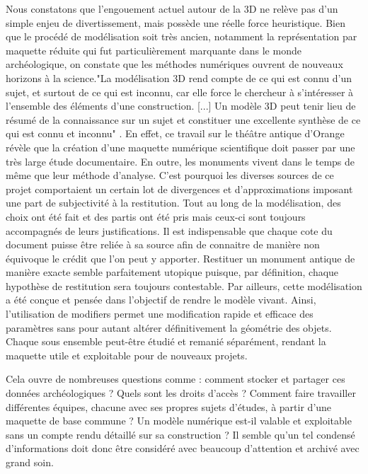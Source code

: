 Nous constatons que l'engouement actuel autour de la 3D ne relève pas d'un simple enjeu de divertissement, mais possède une réelle force heuristique. Bien que le procédé de modélisation soit très ancien, notamment la représentation par maquette réduite qui fut particulièrement marquante dans le monde archéologique, on constate que les méthodes numériques ouvrent de nouveaux horizons à la science."La modélisation 3D rend compte de ce qui est connu d’un sujet, et surtout de ce qui est inconnu, car elle force le chercheur à s’intéresser à l’ensemble des éléments d’une construction. [...] Un modèle 3D peut tenir lieu de résumé de la connaissance sur un sujet et constituer une excellente synthèse de ce qui est connu et inconnu" \cite[p. 249]{rocheleau}. En effet, ce travail sur le théâtre antique d'Orange révèle que la création d'une maquette numérique scientifique doit passer par une très large étude documentaire. En outre, les monuments vivent dans le temps de même que leur méthode d'analyse. C'est pourquoi les diverses sources de ce projet comportaient un certain lot de divergences et d'approximations imposant une part de subjectivité à la restitution. Tout au long de la modélisation, des choix ont été fait et des partis ont été pris mais ceux-ci sont toujours accompagnés de leurs justifications. Il est indispensable que chaque cote du document puisse être reliée à sa source afin de connaitre de manière non équivoque le crédit que l'on peut y apporter. Restituer un monument antique de manière exacte semble parfaitement utopique puisque, par définition, chaque hypothèse de restitution sera toujours contestable.
Par ailleurs, cette modélisation a été conçue et pensée dans l'objectif de rendre le modèle vivant. Ainsi, l'utilisation de \glspl{modifier} permet une modification rapide et efficace des paramètres sans pour autant altérer définitivement la géométrie des objets. Chaque sous ensemble peut-être étudié et remanié séparément, rendant la maquette utile et exploitable pour de nouveaux projets.

Cela ouvre de nombreuses questions comme : comment stocker et partager ces données archéologiques ? Quels sont les droits d'accès ? Comment faire travailler différentes équipes, chacune avec ses propres sujets d'études, à partir d'une maquette de base commune ? Un modèle numérique est-il valable et exploitable sans un compte rendu détaillé sur sa construction ? Il semble qu'un tel condensé d'informations doit donc être considéré avec beaucoup d'attention et archivé avec grand soin. 

